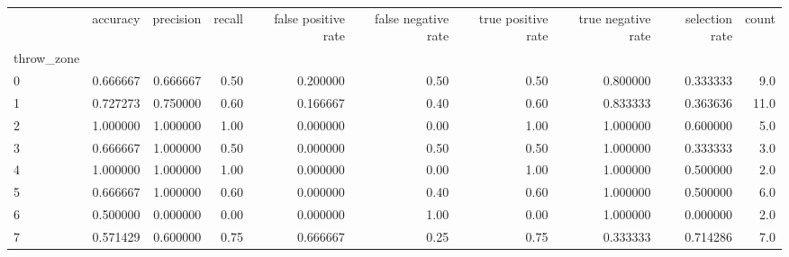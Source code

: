 \begin{tabular}{lrrrrrrrrr}
\toprule
{} &  accuracy &  precision &  recall &  false positive rate &  false negative rate &  true positive rate &  true negative rate &  selection rate &  count \\
throw\_zone &           &            &         &                      &                      &                     &                     &                 &        \\
\midrule
0          &  0.666667 &   0.666667 &    0.50 &             0.200000 &                 0.50 &                0.50 &            0.800000 &        0.333333 &    9.0 \\
1          &  0.727273 &   0.750000 &    0.60 &             0.166667 &                 0.40 &                0.60 &            0.833333 &        0.363636 &   11.0 \\
2          &  1.000000 &   1.000000 &    1.00 &             0.000000 &                 0.00 &                1.00 &            1.000000 &        0.600000 &    5.0 \\
3          &  0.666667 &   1.000000 &    0.50 &             0.000000 &                 0.50 &                0.50 &            1.000000 &        0.333333 &    3.0 \\
4          &  1.000000 &   1.000000 &    1.00 &             0.000000 &                 0.00 &                1.00 &            1.000000 &        0.500000 &    2.0 \\
5          &  0.666667 &   1.000000 &    0.60 &             0.000000 &                 0.40 &                0.60 &            1.000000 &        0.500000 &    6.0 \\
6          &  0.500000 &   0.000000 &    0.00 &             0.000000 &                 1.00 &                0.00 &            1.000000 &        0.000000 &    2.0 \\
7          &  0.571429 &   0.600000 &    0.75 &             0.666667 &                 0.25 &                0.75 &            0.333333 &        0.714286 &    7.0 \\
\bottomrule
\end{tabular}
